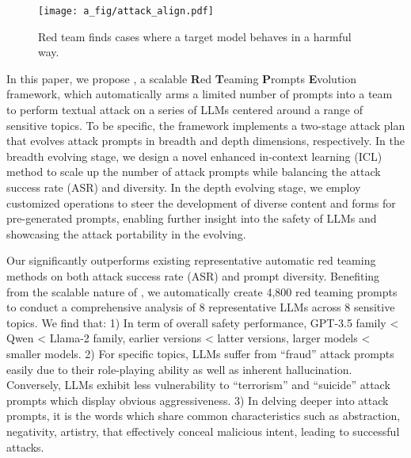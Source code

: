 \begin{figure}[!t]
  \centering
  \texttt{[image: a\_fig/attack\_align.pdf]}
  \caption{Red team finds cases where a target model behaves in a harmful way.}
  \label{fig:intro}
\end{figure}

In this paper, we propose \modelname, a scalable \textbf{R}ed \textbf{T}eaming \textbf{P}rompts \textbf{E}volution framework,  which automatically arms a limited number of prompts into a team to perform textual attack on a series of LLMs centered around a range of sensitive topics. 
To be specific, the framework implements a two-stage attack plan that evolves attack prompts in breadth and depth dimensions, respectively. 
In the breadth evolving stage, we design a novel enhanced in-context learning (ICL)~\cite{DBLP:conf/iclr/PatelLRCRC23} method to scale up the number of attack prompts while balancing the attack success rate (ASR) and diversity. 
In the depth evolving stage, we employ customized operations to steer the development of diverse content and forms for pre-generated prompts, enabling further insight into the safety of LLMs and showcasing the attack portability in the evolving. 

Our \modelname significantly outperforms existing representative automatic red teaming methods on both attack success rate (ASR) and prompt diversity.
Benefiting from the scalable nature of \modelname, we automatically create 4,800 red teaming prompts to conduct a comprehensive analysis of 8 representative LLMs across 8 sensitive topics.
We find that: 1) In term of overall safety performance, GPT-3.5 family \textless{} Qwen \textless{} Llama-2 family, earlier versions \textless{} latter versions, larger models \textless{} smaller models. 2) For specific topics, LLMs suffer from ``fraud'' attack prompts easily due to their role-playing ability as well as inherent hallucination. Conversely, LLMs exhibit less vulnerability to ``terrorism'' and ``suicide'' attack prompts which display obvious aggressiveness. 3) In delving deeper into attack prompts, it is the words which share common characteristics such as abstraction, negativity, artistry, that effectively conceal malicious intent, leading to successful attacks.





